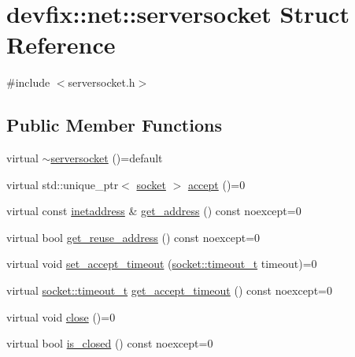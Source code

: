 \hypertarget{structdevfix_1_1net_1_1serversocket}{}\section{devfix\+:\+:net\+:\+:serversocket Struct Reference}
\label{structdevfix_1_1net_1_1serversocket}


{\ttfamily \#include $<$serversocket.\+h$>$}

\subsection*{Public Member Functions}
\begin{DoxyCompactItemize}
\item 
virtual \hyperlink{structdevfix_1_1net_1_1serversocket_afd9f315c4018808c790478710f52d8ab}{$\sim$serversocket} ()=default
\item 
virtual std\+::unique\+\_\+ptr$<$ \hyperlink{structdevfix_1_1net_1_1socket}{socket} $>$ \hyperlink{structdevfix_1_1net_1_1serversocket_a7b3ea6aad486060acdd1385a08f7db81}{accept} ()=0
\item 
virtual const \hyperlink{structdevfix_1_1net_1_1inetaddress}{inetaddress} \& \hyperlink{structdevfix_1_1net_1_1serversocket_a087a819b8173bfa101ea65ea8a17eb8c}{get\+\_\+address} () const noexcept=0
\item 
virtual bool \hyperlink{structdevfix_1_1net_1_1serversocket_a7efdb1f57d0e482542fda50a2403230d}{get\+\_\+reuse\+\_\+address} () const noexcept=0
\item 
virtual void \hyperlink{structdevfix_1_1net_1_1serversocket_ae67a25cf26fe54ce7b10d07ff9219ce7}{set\+\_\+accept\+\_\+timeout} (\hyperlink{structdevfix_1_1net_1_1socket_a80a3bf4cb7292bae31ea9c6575539c68}{socket\+::timeout\+\_\+t} timeout)=0
\item 
virtual \hyperlink{structdevfix_1_1net_1_1socket_a80a3bf4cb7292bae31ea9c6575539c68}{socket\+::timeout\+\_\+t} \hyperlink{structdevfix_1_1net_1_1serversocket_acde0979277bf9536f54bb0fb6a9cc881}{get\+\_\+accept\+\_\+timeout} () const noexcept=0
\item 
virtual void \hyperlink{structdevfix_1_1net_1_1serversocket_ab1762c3364c8298dbac6c3dd67a1e7aa}{close} ()=0
\item 
virtual bool \hyperlink{structdevfix_1_1net_1_1serversocket_a37cc4e3ecede2a0bc52f90e49fcbe4a9}{is\+\_\+closed} () const noexcept=0
\end{DoxyCompactItemize}


